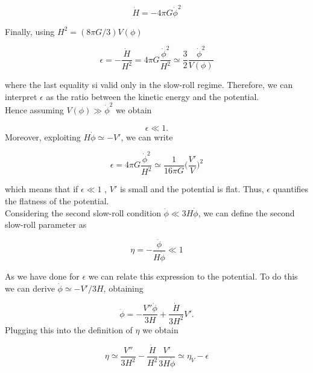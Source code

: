 \documentclass[11pt,a4paper,twoside]{book}
\begin{document}
\begin{equation}
	\label{Hdot}
	\dot{H} = -4\pi G\dot{\phi}^{2}
\end{equation}

Finally, using $ H^{2}=(8\pi G/3)V(\phi) $  

\begin{equation}
	\label{epsilon2}
	\epsilon= - \frac{\dot{H}}{H^{2}}=4\pi G \frac{\dot{\phi}^{2}}{H^{2}} \simeq \frac{3}{2} \frac{\dot{\phi}^{2}}{V(\phi)}
\end{equation}

where the last equality si valid only in the slow-roll regime. Therefore, we can interpret $\epsilon$ as the ratio between the kinetic energy and the potential. \\
Hence assuming $ V(\phi) \gg \dot{\phi}^{2}  $ we obtain 

\begin{equation}
	\label{conditionEpsilon}
	\epsilon \ll 1 .
\end{equation}
Moreover, exploiting $ H\dot{\phi} \simeq -V' $, we can write

\begin{equation}
	\label{newEpsilon}
	\epsilon=4\pi G \frac{\dot{\phi}^{2}}{H^{2}} \simeq \frac{1}{16\pi G} \Big (\frac{V'}{V} \Big )^{2}	
\end{equation}

which means that if $\epsilon \ll 1 $ , $V'$ is small and the potential is flat. Thus, $\epsilon$ quantifies the flatness of the potential.\\

Considering the second slow-roll condition $ \ddot{\phi} \ll 3H\dot{\phi} $, we can define the second slow-roll parameter as 

\begin{equation}
	\label{etaParameter}
	\eta = - \frac{\ddot{\phi}}{H\dot{\phi}} \ll 1
\end{equation}

As we have done for $\epsilon$ we can relate this expression to the potential. To do this we can derive $ \dot{\phi} \simeq -V'/3H $, obtaining

\begin{equation}
	\label{phiDerivedEtaParameter}
	\ddot{\phi} = -\frac{V'' \dot{\phi}}{3H} + \frac{\dot{H}}{3H^{2}}V'.
\end{equation}
Plugging this into the definition of $\eta$ we obtain

\begin{equation}
	\label{eta2}
	\eta \simeq \frac{V''}{3H^{2}} - \frac{\dot{H}}{H^{2}}\frac{V'}{3H\dot{\phi}} \simeq \eta_{V} - \epsilon
\end{equation}
\end{document}
